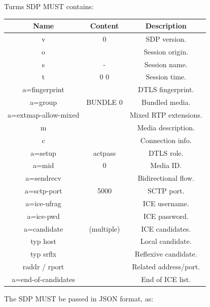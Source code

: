 Turms SDP MUST contains:
\begin{center}
\begin{tabular}{||c c c||} 
 \hline
 Name & Content & Description \\ [0.5ex] 
 \hline\hline
 v & 0 & SDP version. \\ 
 \hline
 o &  & Session origin. \\ 
 \hline
 s & - & Session name. \\ 
 \hline
 t & 0 0 & Session time. \\ 
 \hline
 a=fingerprint &  & DTLS fingerprint. \\ 
 \hline
 a=group & BUNDLE 0 & Bundled media. \\ 
 \hline
 a=extmap-allow-mixed &  & Mixed RTP extensions. \\ 
 \hline
 m &  & Media description. \\ 
 \hline
 c &  & Connection info. \\ 
 \hline
 a=setup & actpass & DTLS role. \\ 
 \hline
 a=mid & 0 & Media ID. \\ 
 \hline
 a=sendrecv &  & Bidirectional flow. \\ 
 \hline
 a=sctp-port & 5000 & SCTP port. \\ 
 \hline
 a=ice-ufrag &  & ICE username. \\ 
 \hline
 a=ice-pwd &  & ICE password. \\ 
 \hline
 a=candidate & (multiple) & ICE candidates. \\ 
 \hline
 typ host &  & Local candidate. \\ 
 \hline
 typ srflx &  & Reflexive candidate. \\ 
 \hline
 raddr / rport &  & Related address/port. \\ 
 \hline
 a=end-of-candidates &  & End of ICE list. \\ 
 \hline
\end{tabular}
\end{center}

The SDP MUST be passed in JSON format, as:
\begin{center}
\end{center}

